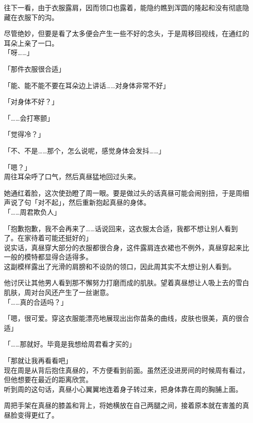 往下一看，由于衣服露肩，因而领口也露着，能隐约瞧到浑圆的隆起和没有彻底隐藏在衣服下的沟。

尽管绝妙，但要是看了太多便会产生一些不好的念头，于是周移回视线，在通红的耳朵上亲了一口。\\

「呀……」

「那件衣服很合适」

「能、能不能不要在耳朵边上讲话……对身体非常不好」

「对身体不好？」

「……会打寒颤」

「觉得冷？」

「不、不是……那个，怎么说呢，感觉身体会发抖……」

「嗯？」\\

周往耳朵呼了口气，然后真昼猛地回过头来。

她通红着脸，这次使劲瞪了周一眼。要是做过头的话真昼可能会闹别扭，于是周细声说了句「对不起」，然后重新抱起真昼的身体。\\

「……周君欺负人」

「抱歉抱歉，我不会再来了……话说回来，这衣服太合适，我都不想让别人看到了。在家待着可能还挺好的」\\

说实话，真昼穿大部分的衣服都很合身，这件露肩连衣裙也不例外，真昼穿起来比一般的模特都显得合适得多。\\

这副模样露出了光滑的肩膀和不设防的领口，因此周其实不太想让别人看到。

他讨厌让其他男人看到那不懈努力打磨而成的肌肤。望着真昼想让人吸上去的雪白肌肤，周对台风还产生了一丝谢意。\\

「……真的合适吗？」

「嗯，很可爱。穿这衣服能漂亮地展现出出你苗条的曲线，皮肤也很美，真的很合适」

「……那就好。毕竟是我想给周君看才买的」

「那就让我再看看吧」\\

现在周是从背后抱住真昼的，不方便看到前面。虽然还没进房间的时候周有看过，但他想要在最近的距离欣赏。\\

听到周的这句话，真昼小心翼翼地连着身子转过来，把身体靠在周的胸脯上面。

周把手架在真昼的膝盖和背上，将她横放在自己两腿之间，接着原本就在害羞的真昼脸变得更红了。\\


